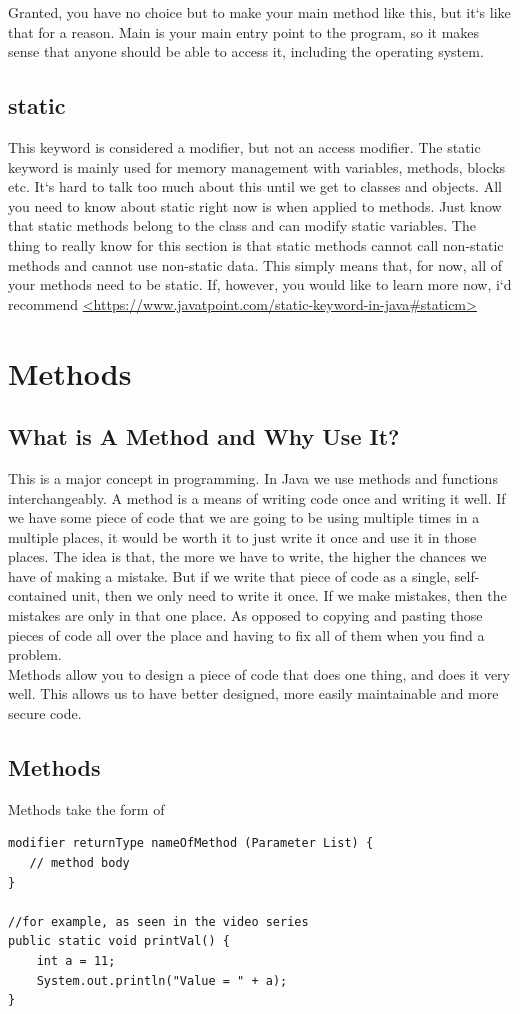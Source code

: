 \documentclass[11]{article}
\begin{document}
Granted, you have no choice but to make your main method like this, but it`s like that for a reason. Main is your main entry point to the program, so it makes sense that anyone should be able to access it, including the operating system.
\subsection{static}
This keyword is considered a modifier, but not an access modifier. The static keyword is mainly used for memory management with variables, methods, blocks etc. It`s hard to talk too much about this until we get to classes and objects. All you need to know about static right now is when applied to methods. Just know that static methods belong to the class and can modify static variables. The thing to really know for this section is  that static methods cannot call non-static methods and cannot use non-static data. This simply means that, for now, all of your methods need to be static. If, however, you would like to learn more now, i`d recommend \url{<https://www.javatpoint.com/static-keyword-in-java#staticm>}

\section{Methods}
\subsection{What is A Method and Why Use It?}
This is a major concept in programming. In Java we use methods and functions interchangeably. A method is a means of writing code once and writing it well. If we have some piece of code that we are going to be using multiple times in a multiple places, it would be worth it to just write it once and use it in those places. The idea is that, the more we have to write, the higher the chances we have of making a mistake. But if we write that piece of code as a single, self-contained unit, then we only need to write it once. If we make mistakes, then the mistakes are only in that one place. As opposed to copying and pasting those pieces of code all over the place and having to fix all of them when you find a problem.\\

Methods allow you to design a piece of code that does one thing, and does it very well. This allows us to have better designed, more easily maintainable and more secure code.\\
\subsection{Methods}
Methods take the form of
\begin{lstlisting}
modifier returnType nameOfMethod (Parameter List) {
   // method body
}

//for example, as seen in the video series
public static void printVal() {
    int a = 11;
    System.out.println("Value = " + a);
}

\end{lstlisting}
\end{document}
